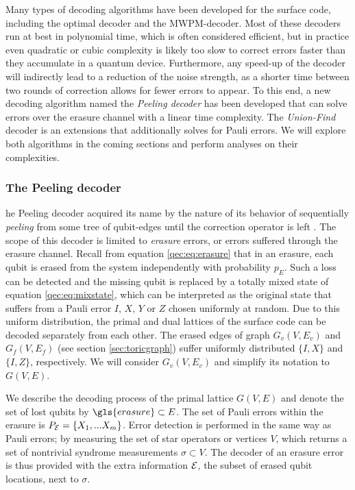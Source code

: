 Many types of decoding algorithms have been developed for the surface code, including the optimal decoder and the MWPM-decoder. Most of these decoders run at best in polynomial time, which is often considered efficient, but in practice even quadratic or cubic complexity is likely too slow to correct errors faster than they accumulate in a quantum device. Furthermore, any speed-up of the decoder will indirectly lead to a reduction of the noise strength, as a shorter time between two rounds of correction allows for fewer errors to appear. To this end, a new decoding algorithm named the \emph{Peeling decoder} has been developed that can solve errors over the erasure channel with a linear time complexity. The \emph{Union-Find} decoder is an extensions that additionally solves for Pauli errors. We will explore both algorithms in the coming sections and perform analyses on their complexities. 

\subsubsection{The Peeling decoder}
he Peeling decoder acquired its name by the nature of its behavior of sequentially \emph{peeling} from some tree of qubit-edges until the correction operator is left \cite{delfosse2017linear}. The scope of this decoder is limited to \emph{erasure} errors, or errors suffered through the erasure channel. Recall from equation \ref{qec:eq:erasure} that in an erasure, each qubit is erased from the system independently with probability $p_E$. Such a loss can be detected and the missing qubit is replaced by a totally mixed state of equation \ref{qec:eq:mixstate}, which can be interpreted as the original state that suffers from a Pauli error $I$, $X$, $Y$ or $Z$ chosen uniformly at random. Due to this uniform distribution, the primal and dual lattices of the surface code can be decoded separately from each other. The erased edges of graph $G_v(V,E_v)$ and $G_f(V,E_f)$ (see section \ref{sec:toricgraph}) suffer uniformly distributed $\{I,X\}$ and $\{I,Z\}$, respectively. We will consider $G_v(V,E_v)$ and simplify its notation to $G(V,E)$. 

We describe the decoding process of the primal lattice $G(V,E)$ and denote the set of lost qubits by $\gls{erasure}\subset E$. The set of Pauli errors within the erasure is $P_{\mathcal{E}} = \{X_1,...X_m\}$. Error detection is performed in the same way as Pauli errors; by measuring the set of star operators or vertices $V$, which returns a set of nontrivial syndrome measurements $\sigma \subset V$. The decoder of an erasure error is thus provided with the extra information $\mathcal{E}$, the subset of erased qubit locations, next to $\sigma$. 


